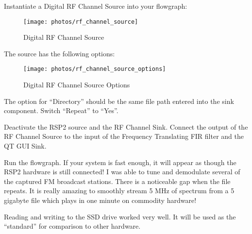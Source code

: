 Instantiate a Digital RF Channel Source into your flowgraph:

\begin{figure}[H]
	\centering
	\texttt{[image: photos/rf\_channel\_source]}
	\centering\bfseries
	\caption{Digital RF Channel Source}
\end{figure}

The source has the following options:

\begin{figure}[H]
	\centering
	\texttt{[image: photos/rf\_channel\_source\_options]}
	\centering\bfseries
	\caption{Digital RF Channel Source Options}
\end{figure}

The option for ``Directory'' should be the same file path entered into the sink component.  Switch ``Repeat'' to ``Yes''.

Deactivate the RSP2 source and the RF Channel Sink.  Connect the output of the RF Channel Source to the input of the Frequency Translating FIR filter and the QT GUI Sink.

Run the flowgraph.  If your system is fast enough, it will appear as though the RSP2 hardware is still connected!  I was able to tune and demodulate several of the captured FM broadcast stations.  There is a noticeable gap when the file repeats.  It is really amazing to smoothly stream 5 MHz of spectrum from a 5 gigabyte file which plays in one minute on commodity hardware!

Reading and writing to the SSD drive worked very well.  It will be used as the ``standard'' for comparison to other hardware.